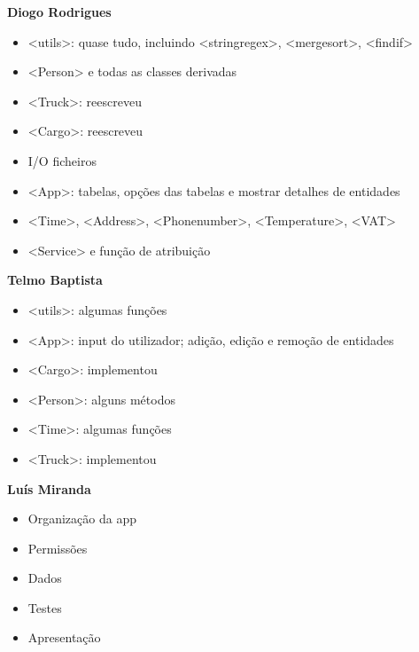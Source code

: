 \documentclass{beamer}
\def\texttt#1{<#1>}
\begin{document}
\begin{frame}
\begin{minipage}[t]{0.33\linewidth}
	\textbf{Diogo Rodrigues}
	{\footnotesize \begin{itemize}
		\item \texttt{utils}: quase tudo, incluindo \texttt{stringregex}, \texttt{mergesort}, \texttt{findif}		
		\item \texttt{Person} e todas as classes derivadas
		\item \texttt{Truck}: reescreveu
		\item \texttt{Cargo}: reescreveu				
		\item I/O ficheiros
		\item \texttt{App}: tabelas, opções das tabelas e mostrar detalhes de entidades
		\item \texttt{Time}, \texttt{Address}, \texttt{Phonenumber}, \texttt{Temperature}, \texttt{VAT}
		\item \texttt{Service} e função de atribuição
	\end{itemize} }
\end{minipage}%
\begin{minipage}[t]{0.33\linewidth}
	\textbf{Telmo Baptista}
	{\footnotesize \begin{itemize}
		\item \texttt{utils}: algumas funções
		\item \texttt{App}: input do utilizador; adição, edição e remoção de entidades
		\item \texttt{Cargo}: implementou
		\item \texttt{Person}: alguns métodos
		\item \texttt{Time}: algumas funções
		\item \texttt{Truck}: implementou
	\end{itemize} }
\end{minipage}%
\begin{minipage}[t]{0.33\linewidth}
	\textbf{Luís Miranda}
	{\footnotesize \begin{itemize}
		\item Organização da app
		\item Permissões
		\item Dados
		\item Testes
		\item Apresentação
	\end{itemize} }
\end{minipage}
\end{frame}
\end{document}

